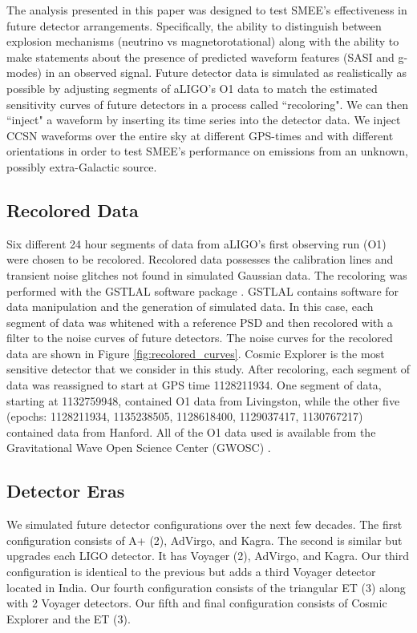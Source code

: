 \documentclass[letterpaper, aps, prd, twocolumn, superscriptaddress, showpacs, nofootinbib]{revtex4}
\begin{document}
The analysis presented in this paper was designed to test SMEE's effectiveness in future detector arrangements. Specifically, the ability to distinguish between explosion mechanisms (neutrino vs magnetorotational) along with the ability to make statements about the presence of predicted waveform features (SASI and g-modes) in an observed signal. Future detector data is simulated as realistically as possible by adjusting segments of aLIGO's O1 data to match the estimated sensitivity curves of future detectors in a process called ``recoloring". We can then ``inject" a waveform by inserting its time series into the detector data. We inject CCSN waveforms over the entire sky at different GPS-times and with different orientations in order to test SMEE's performance on emissions from an unknown, possibly extra-Galactic source.

\subsection{Recolored Data}

Six different 24 hour segments of data from aLIGO's first observing run (O1) were chosen to be recolored. Recolored data possesses the calibration lines and transient noise glitches not found in simulated Gaussian data. The recoloring was performed with the GSTLAL software package \cite{messick2017analysis}. GSTLAL contains software for data manipulation and the generation of simulated data. In this case, each segment of data was whitened with a reference PSD and then recolored with a filter to the noise curves of future detectors. The noise curves for the recolored data are shown in Figure \ref{fig:recolored_curves}. Cosmic Explorer is the most sensitive detector that we consider in this study. After recoloring, each segment of data was reassigned to start at GPS time 1128211934. One segment of data, starting at 1132759948, contained O1 data from Livingston, while the other five (epochs: 1128211934, 1135238505, 1128618400, 1129037417, 1130767217) contained data from Hanford. All of the O1 data used is available from the Gravitational Wave Open Science Center (GWOSC) \cite{2015JPhCS.610a2021V}. 

\subsection{Detector Eras}
\label{subsec:eras}

We simulated future detector configurations over the next few decades. The first configuration consists of A+ (2), AdVirgo, and Kagra. The second is similar but upgrades each LIGO detector. It has Voyager (2), AdVirgo, and Kagra. Our third configuration is identical to the previous but adds a third Voyager detector located in India. Our fourth configuration consists of the triangular ET (3) along with 2 Voyager detectors. Our fifth and final configuration consists of Cosmic Explorer and the ET (3).
\end{document}
